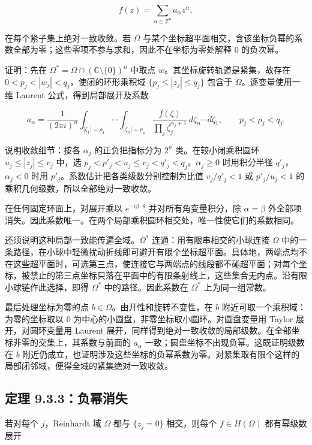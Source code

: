 \documentclass[11pt,a4paper]{article}
\begin{document}
\[
f(z)=\sum_{\alpha\in\mathbb Z^n}a_\alpha z^\alpha,
\]

在每个紧子集上绝对一致收敛。若 \(\Omega\)
与某个坐标超平面相交，含该坐标负幂的系数全部为零；这些零项不参与求和，因此不在坐标为零处解释
\(0\) 的负次幂。

证明：先在 \(\Omega^*=\Omega\cap(\mathbb C\setminus\{0\})^n\) 中取点
\(w\)。其坐标旋转轨道是紧集，故存在
\(0<p_j<|w_j|<q_j\)，使闭的环形乘积域 \(\{p_j\le|z_j|\le q_j\}\) 包含于
\(\Omega\)。逐变量使用一维 Laurent 公式，得到局部展开及系数

\[
a_\alpha=\frac1{(2\pi i)^n}\int_{|\zeta_1|=\rho_1}\!\cdots\!\int_{|\zeta_n|=\rho_n}
\frac{f(\zeta)}{\prod_j\zeta_j^{\alpha_j+1}}
\,d\zeta_n\cdots d\zeta_1,
\qquad p_j<\rho_j<q_j.
\]

说明收敛细节：按各 \(\alpha_j\) 的正负把指标分为 \(2^n\)
类。在较小闭乘积圆环 \(u_j\le|z_j|\le v_j\) 中，选
\(p_j<p'_j<u_j\le v_j<q'_j<q_j\)。\(\alpha_j\ge0\) 时用积分半径
\(q'_j\)，\(\alpha_j<0\) 时用 \(p'_j\)。系数估计把各类级数分别控制为比值
\(v_j/q'_j<1\) 或 \(p'_j/u_j<1\) 的乘积几何级数，所以全部绝对一致收敛。

在任何固定环面上，对展开乘以 \(e^{-i\beta\cdot\theta}\)
并对所有角变量积分，除 \(\alpha=\beta\)
外全部项消失。因此系数唯一。在两个局部乘积圆环相交处，唯一性使它们的系数相同。

还须说明这种局部一致能传遍全域。\(\Omega^*\)
连通：用有限串相交的小球连接 \(\Omega\)
中的一条路径，在小球中轻微扰动折线即可避开有限个坐标超平面。具体地，两端点均不在这些超平面时，可选第三点，使连接它与两端点的线段都不碰超平面；对每个坐标，被禁止的第三点坐标只落在平面中的有限条射线上，这些集合无内点。沿有限小球链作此选择，即得
\(\Omega^*\) 中的路径。因此系数在 \(\Omega^*\) 上为同一组常数。

最后处理坐标为零的点 \(b\in\Omega\)。由开性和旋转不变性，在 \(b\)
附近可取一个乘积域：为零的坐标取以 \(0\)
为中心的小圆盘，非零坐标取小圆环。对圆盘变量用 Taylor 展开，对圆环变量用
Laurent
展开，同样得到绝对一致收敛的局部级数。在全部坐标非零的交集上，其系数与前面的
\(a_\alpha\) 一致；圆盘坐标不出现负幂。这既证明级数在 \(b\)
附近仍成立，也证明涉及这些坐标的负幂系数为零。对紧集取有限个这样的局部闭邻域，便得全域的紧集绝对一致收敛。

\subsection{定理 9.3.3：负幂消失}\label{ch09-s3-heading-4}

若对每个 \(j\)，Reinhardt 域 \(\Omega\) 都与 \(\{z_j=0\}\) 相交，则每个
\(f\in H(\Omega)\) 都有幂级数展开
\end{document}
